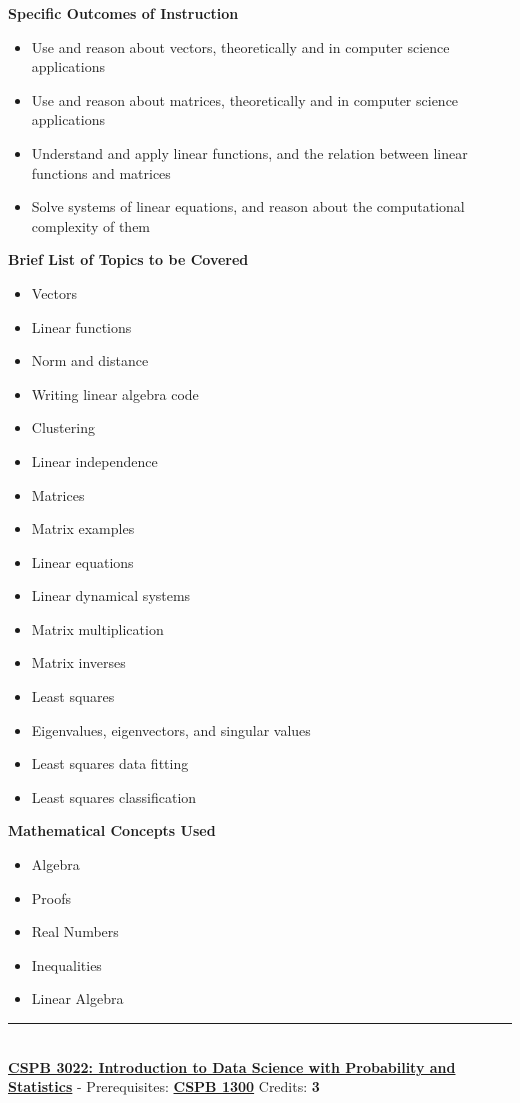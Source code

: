 \documentclass{article}
\newcommand{\horizontalline}{\noindent \rule{\textwidth}{0.5pt} \\}
\begin{document}
\noindent \textbf{Specific Outcomes of Instruction}
\begin{itemize}
    \item Use and reason about vectors, theoretically and in computer science applications
    \item Use and reason about matrices, theoretically and in computer science applications
    \item Understand and apply linear functions, and the relation between linear functions and matrices
    \item Solve systems of linear equations, and reason about the computational complexity of them
\end{itemize}

\noindent \textbf{Brief List of Topics to be Covered}
\begin{itemize}
    \item Vectors
    \item Linear functions
    \item Norm and distance
    \item Writing linear algebra code
    \item Clustering
    \item Linear independence
    \item Matrices
    \item Matrix examples
    \item Linear equations
    \item Linear dynamical systems
    \item Matrix multiplication
    \item Matrix inverses
    \item Least squares
    \item Eigenvalues, eigenvectors, and singular values
    \item Least squares data fitting
    \item Least squares classification
\end{itemize}

\noindent \textbf{Mathematical Concepts Used}
\begin{itemize}
    \item Algebra
    \item Proofs
    \item Real Numbers
    \item Inequalities
    \item Linear Algebra
\end{itemize}
\horizontalline
\noindent \href{https://www.colorado.edu/program/cspb/cspb-3022-introduction-data-science-probability-and-statistics}{\textbf{CSPB 3022: Introduction to Data Science with Probability and Statistics}} - Prerequisites: \href{https://www.colorado.edu/program/cspb/cspb-1300-computer-science-1-starting-computing}{\textbf{CSPB 1300}} Credits: \textbf{3} \\ 
\end{document}
